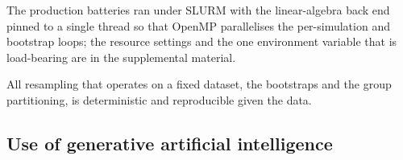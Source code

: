 The production batteries ran under SLURM with the linear-algebra back end pinned to a single
thread so that OpenMP parallelises the per-simulation and bootstrap loops; the resource
settings and the one environment variable that is load-bearing are in the supplemental material.

All resampling that operates on a fixed dataset, the bootstraps and the group partitioning, is
deterministic and reproducible given the data.

\subsection*{Use of generative artificial intelligence}

